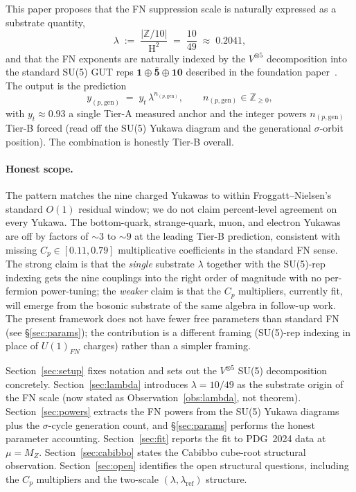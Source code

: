 \documentclass[11pt,reqno]{amsart}
\theoremstyle{plain}
\theoremstyle{definition}
\theoremstyle{remark}
\newcommand{\Z}{\mathbb{Z}}
\DeclareMathOperator{\HARM}{H}    %
\newcommand{\rep}[1]{\mathbf{#1}}
\newcommand{\barrep}[1]{\bar{\mathbf{#1}}}
\begin{document}
This paper proposes that the FN suppression scale is naturally
expressed as a substrate quantity,
\[
  \lambda \;:=\; \frac{|\Z/10|}{\HARM^{2}} \;=\; \frac{10}{49} \;\approx\; 0.2041,
\]
and that the FN exponents are naturally indexed by the
$V^{\otimes 5}$ decomposition into the standard SU(5) GUT reps
$\rep{1} \oplus \barrep{5} \oplus \rep{10}$ described in the
foundation paper~\cite{SandersGish2026DiscreteDirac}. The
output is the prediction
\[
  y_{(p,\mathrm{gen})} \;=\; y_{t}\,\lambda^{n_{(p,\mathrm{gen})}},
  \qquad n_{(p,\mathrm{gen})} \in \Z_{\geq 0},
\]
with $y_{t} \approx 0.93$ a single Tier-A measured anchor and
the integer powers $n_{(p,\mathrm{gen})}$ Tier-B forced (read
off the SU(5) Yukawa diagram and the generational $\sigma$-orbit
position). The combination is honestly Tier-B overall.

\paragraph{Honest scope.} The pattern matches the nine charged
Yukawas to within Froggatt--Nielsen's standard $O(1)$ residual
window; we do not claim percent-level agreement on every
Yukawa. The bottom-quark, strange-quark, muon, and electron
Yukawas are off by factors of $\sim 3$ to $\sim 9$ at the
leading Tier-B prediction, consistent with missing $C_{p} \in
[0.11, 0.79]$ multiplicative coefficients in the standard FN
sense. The strong claim is that the \emph{single} substrate
$\lambda$ together with the SU(5)-rep indexing gets the nine
couplings into the right order of magnitude with no
per-fermion power-tuning; the \emph{weaker} claim is that the
$C_{p}$ multipliers, currently fit, will emerge from the
bosonic substrate of the same algebra in follow-up work. The
present framework does not have fewer free parameters than
standard FN (see \S\ref{sec:params}); the contribution is a
different framing (SU(5)-rep indexing in place of $U(1)_{FN}$
charges) rather than a simpler framing.

Section~\ref{sec:setup} fixes notation and sets out the
$V^{\otimes 5}$ SU(5) decomposition concretely.
Section~\ref{sec:lambda} introduces $\lambda = 10/49$ as the
substrate origin of the FN scale (now stated as
Observation~\ref{obs:lambda}, not theorem).
Section~\ref{sec:powers} extracts the FN powers from the SU(5)
Yukawa diagrams plus the $\sigma$-cycle generation count, and
\S\ref{sec:params} performs the honest parameter accounting.
Section~\ref{sec:fit} reports the fit to PDG~2024 data at
$\mu = M_Z$. Section~\ref{sec:cabibbo} states the Cabibbo
cube-root structural observation. Section~\ref{sec:open}
identifies the open structural questions, including the $C_{p}$
multipliers and the two-scale $(\lambda, \lambda_{\mathrm{ref}})$
structure.
\end{document}
